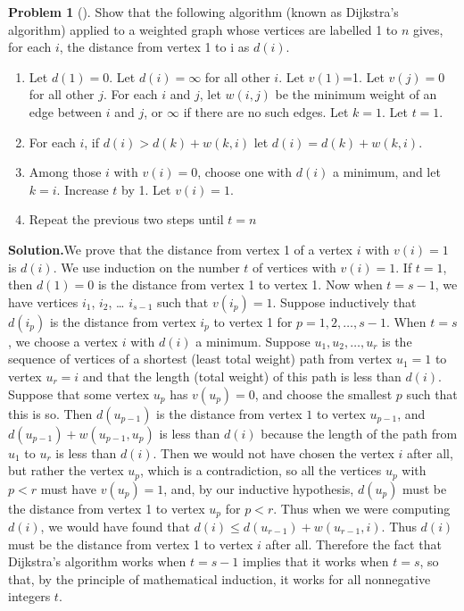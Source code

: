 \documentclass[10pt,]{book}
\theoremstyle{plain}
\theoremstyle{definition}
\newtheorem{activity}[project]{Problem}
\theoremstyle{definition}
\numberwithin{equation}{chapter}
\newcommand{\lt}{<}
\begin{document}
\begin{activity}[]\label{Dijkstra}
Show that the following algorithm (known as Dijkstra's algorithm) applied to a weighted graph whose vertices are labelled 1 to \(n\) gives, for each \(i\), the distance from vertex 1 to i as \(d(i)\). \leavevmode%
\begin{enumerate}
\item\hypertarget{li-28}{}Let \(d(1) = 0\). Let \(d(i) = \infty\) for all other \(i\).  Let \(v(1)\)=1. Let \(v(j) = 0\) for all other \(j\).  For each \(i\) and \(j\), let \(w(i,j)\) be the minimum weight of an edge between \(i\) and \(j\), or \(\infty\) if there are no such edges.  Let \(k=1\).  Let \(t=1\).%
\item\hypertarget{li-29}{}For each \(i\), if \(d(i)>d(k) + w(k,i)\) let \(d(i)= d(k) +w(k,i)\).%
\item\hypertarget{li-30}{}Among those \(i\) with \(v(i)=0\), choose one with \(d(i)\) a minimum, and let \(k=i\).  Increase \(t\) by 1. Let \(v(i) =1.\)%
\item\hypertarget{li-31}{}Repeat the previous two steps until \(t=n\)%
\end{enumerate}
%
\par\medskip\noindent%
\textbf{Solution.}\quad We prove that the distance from vertex 1 of a vertex \(i\) with \(v(i)=1\) is \(d(i)\). We use induction on the number \(t\) of vertices with \(v(i)=1\). If \(t=1\), then \(d(1)=0\) is the distance from vertex 1 to vertex 1. Now when \(t=s-1\), we have vertices \(i_1\), \(i_2\), \dots{} \(i_{s-1}\) such that \(v(i_p)=1\). Suppose inductively that \(d(i_p)\) is the distance from vertex \(i_p\) to vertex 1 for \(p=1,2,\ldots,s-1\). When \(t=s\), we choose a vertex \(i\) with \(d(i)\) a minimum. Suppose \(u_1,u_2,\ldots, u_r\) is the sequence of vertices of a shortest (least total weight) path from vertex \(u_1=1\) to vertex \(u_r=i\) and that the length (total weight) of this path is less than \(d(i)\). Suppose that some vertex \(u_p\) has \(v(u_p)=0\), and choose the smallest \(p\) such that this is so. Then \(d(u_{p-1})\) is the distance from vertex \(1\) to vertex \(u_{p-1}\), and \(d(u_{p-1}) + w(u_{p-1},u_p)\) is less than \(d(i)\) because the length of the path from \(u_1\) to \(u_r\) is less than \(d(i)\). Then we would not have chosen the vertex \(i\) after all, but rather the vertex \(u_p\), which is a contradiction, so all the vertices \(u_p\) with \(p\lt r\) must have \(v(u_p)=1\), and, by our inductive hypothesis, \(d(u_p)\) must be the distance from vertex 1 to vertex \(u_p\) for \(p\lt r\). Thus when we were computing \(d(i)\), we would have found that \(d(i)\le d(u_{r-1}) +w(u_{r-1},i)\). Thus \(d(i)\) must be the distance from vertex 1 to vertex \(i\) after all. Therefore the fact that Dijkstra's algorithm works when \(t=s-1\) implies that it works when \(t=s\), so that, by the principle of mathematical induction, it works for all nonnegative integers \(t\).%
\end{activity}
\end{document}
